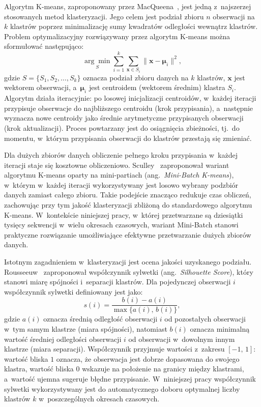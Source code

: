 Algorytm K-means, zaproponowany przez MacQueena~\cite{macqueen1967kmeans}, jest jedną z~najszerzej stosowanych metod klasteryzacji. Jego celem jest podział zbioru $n$ obserwacji na $k$ klastrów poprzez minimalizację sumy kwadratów odległości wewnątrz klastrów. Problem optymalizacyjny rozwiązywany przez algorytm K-means można sformułować następująco:
\begin{equation}
\label{eq:kmeans-objective}
\underset{S}{\arg\min} \sum_{i=1}^{k} \sum_{\mathbf{x} \in S_i} \|\mathbf{x} - \boldsymbol{\mu}_i\|^2,
\end{equation}
gdzie $S = \{S_1, S_2, \ldots, S_k\}$ oznacza podział zbioru danych na $k$ klastrów, $\mathbf{x}$ jest wektorem obserwacji, a~$\boldsymbol{\mu}_i$ jest centroidem (wektorem średnim) klastra $S_i$. Algorytm działa iteracyjnie: po losowej inicjalizacji centroidów, w~każdej iteracji przypisuje obserwacje do najbliższego centroidu (krok przypisania), a~następnie wyznacza nowe centroidy jako średnie arytmetyczne przypisanych obserwacji (krok aktualizacji). Proces powtarzany jest do osiągnięcia zbieżności, tj.~do momentu, w~którym przypisania obserwacji do klastrów przestają się zmieniać.

Dla dużych zbiorów danych obliczenie pełnego kroku przypisania w~każdej iteracji staje się kosztowne obliczeniowo. Sculley~\cite{sculley2010minibatch} zaproponował wariant algorytmu K-means oparty na mini-partiach (ang.~\textit{Mini-Batch K-means}), w~którym w~każdej iteracji wykorzystywany jest losowo wybrany podzbiór danych zamiast całego zbioru. Takie podejście znacząco redukuje czas obliczeń, zachowując przy tym jakość klasteryzacji zbliżoną do standardowego algorytmu K-means. W~kontekście niniejszej pracy, w~której przetwarzane są dziesiątki tysięcy sekwencji w~wielu okresach czasowych, wariant Mini-Batch stanowi praktyczne rozwiązanie umożliwiające efektywne przetwarzanie dużych zbiorów danych.

Istotnym zagadnieniem w~klasteryzacji jest ocena jakości uzyskanego podziału. Rousseeuw~\cite{rousseeuw1987silhouette} zaproponował współczynnik sylwetki (ang.~\textit{Silhouette Score}), który stanowi miarę spójności i~separacji klastrów. Dla pojedynczej obserwacji $i$ współczynnik sylwetki definiowany jest jako:
\begin{equation}
\label{eq:silhouette}
s(i) = \frac{b(i) - a(i)}{\max\{a(i),\, b(i)\}},
\end{equation}
gdzie $a(i)$ oznacza średnią odległość obserwacji $i$ od pozostałych obserwacji w~tym samym klastrze (miara spójności), natomiast $b(i)$ oznacza minimalną wartość średniej odległości obserwacji $i$ od obserwacji w~dowolnym innym klastrze (miara separacji). Współczynnik przyjmuje wartości z~zakresu $[-1,\, 1]$: wartość bliska $1$ oznacza, że obserwacja jest dobrze dopasowana do swojego klastra, wartość bliska $0$ wskazuje na położenie na granicy między klastrami, a~wartość ujemna sugeruje błędne przypisanie. W~niniejszej pracy współczynnik sylwetki wykorzystywany jest do automatycznego doboru optymalnej liczby klastrów $k$ w~poszczególnych okresach czasowych.

